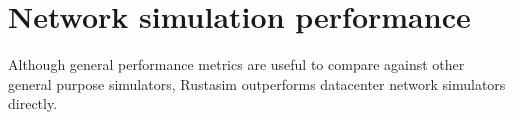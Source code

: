 %
%
%
%
%
%


\section{Network simulation performance} \label{perf-phold}

Although general performance metrics are useful to compare against other general purpose simulators, Rustasim outperforms datacenter network simulators directly.

